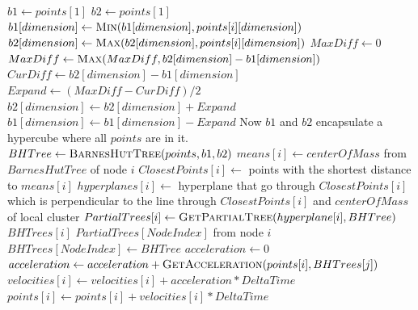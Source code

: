 \documentclass{article}
\begin{document}
\begin{algorithm}
\caption{}
\begin{algorithmic}[1]
		\State $b1 \gets points[1]$
		\State $b2 \gets points[1]$
				\State $b1[dimension] \gets \Call{Min}{b1[dimension], points[i][dimension]}$
				\State $b2[dimension] \gets \Call{Max}{b2[dimension], points[i][dimension]}$
			\EndFor
		\EndFor
		\State $MaxDiff \gets 0$
			$MaxDiff \gets \Call{Max}{MaxDiff, b2[dimension] - b1[dimension]}$
		\EndFor
			\State $CurDiff \gets b2[dimension] - b1[dimension]$
			\State $Expand \gets (MaxDiff - CurDiff) / 2$
			\State $b2[dimension] \gets b2[dimension] + Expand$
			\State $b1[dimension] \gets b1[dimension] - Expand$
		\EndFor \Comment Now $b1$ and $b2$ encapsulate a hypercube where all $points$ are in it.
		\State $BHTree \gets \Call{BarnesHutTree}{points, b1, b2}$
			\State $means[i] \gets centerOfMass$ from $BarnesHutTree$ of node $i$
			\State $ClosestPoints[i] \gets$ points with the shortest distance to $means[i]$
		\EndFor
			\State $hyperplanes[i] \gets$ hyperplane that go through $ClosestPoints[i]$ which is
			perpendicular to the line through $ClosestPoints[i]$ and $centerOfMass$ of local cluster
		\EndFor
			\State $PartialTrees[i] \gets \Call{GetPartialTree}{hyperplane[i], BHTree}$
		\EndFor
				\State $BHTrees[i]$ $PartialTrees[NodeIndex]$ from node $i$
			\EndIf
		\EndFor
		\State $BHTrees[NodeIndex] \gets BHTree$
			\State $acceleration \gets 0$
				\State $acceleration \gets acceleration + \Call{GetAcceleration}{points[i],
				BHTrees[j]}$
			\EndFor
			\State $velocities[i] \gets velocities[i] + acceleration * DeltaTime$
			\State $points[i] \gets points[i] + velocities[i] * DeltaTime$
		\EndFor
	\EndFunction
\end{algorithmic}
\end{algorithm}
\end{document}
